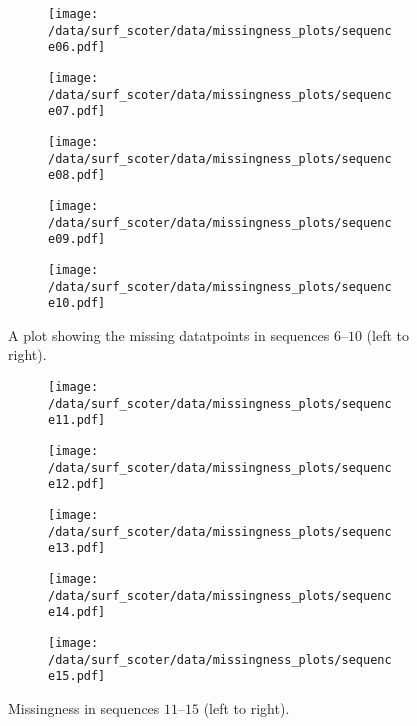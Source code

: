 \begin{figure}[t]
	\begin{subfigure}[b]{0.2\textwidth}
		\centering
		\texttt{[image: /data/surf\_scoter/data/missingness\_plots/sequence06.pdf]}
	\end{subfigure}%
	\begin{subfigure}[b]{0.2\textwidth}
		\centering
		\texttt{[image: /data/surf\_scoter/data/missingness\_plots/sequence07.pdf]}
	\end{subfigure}%
	\begin{subfigure}[b]{0.2\textwidth}
		\centering
		\texttt{[image: /data/surf\_scoter/data/missingness\_plots/sequence08.pdf]}
	\end{subfigure}%
	\begin{subfigure}[b]{0.2\textwidth}
		\centering
		\texttt{[image: /data/surf\_scoter/data/missingness\_plots/sequence09.pdf]}
	\end{subfigure}%
	\begin{subfigure}[b]{0.2\textwidth}
		\centering
		\texttt{[image: /data/surf\_scoter/data/missingness\_plots/sequence10.pdf]}
	\end{subfigure}%
	\caption{A plot showing the missing datatpoints in sequences $6$--$10$ (left to right).}
\end{figure}

\begin{figure}[b]
	\begin{subfigure}[b]{0.2\textwidth}
		\centering
		\texttt{[image: /data/surf\_scoter/data/missingness\_plots/sequence11.pdf]}
	\end{subfigure}%
	\begin{subfigure}[b]{0.2\textwidth}
		\centering
		\texttt{[image: /data/surf\_scoter/data/missingness\_plots/sequence12.pdf]}
	\end{subfigure}%
	\begin{subfigure}[b]{0.2\textwidth}
		\centering
		\texttt{[image: /data/surf\_scoter/data/missingness\_plots/sequence13.pdf]}
	\end{subfigure}%
	\begin{subfigure}[b]{0.2\textwidth}
		\centering
		\texttt{[image: /data/surf\_scoter/data/missingness\_plots/sequence14.pdf]}
	\end{subfigure}%
	\begin{subfigure}[b]{0.2\textwidth}
		\centering
		\texttt{[image: /data/surf\_scoter/data/missingness\_plots/sequence15.pdf]}
	\end{subfigure}%
	\caption{Missingness in sequences $11$--$15$ (left to right).}
\end{figure}

